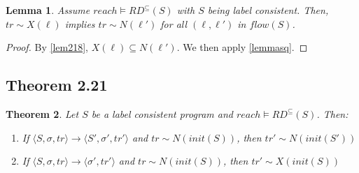 \documentclass[a4wide,12pt]{article}
\theoremstyle{definition}
\theoremstyle{plain}
\newtheorem{theo}{Theorem}
\newtheorem{lemma}[theo]{Lemma}
\theoremstyle{remark}
\def\const#1{\mathopen{\langle}#1\mathclose{\rangle}} %
\def\pair#1{\const{#1}}
\begin{document}
\begin{lemma}\label{lemmaflow}
Assume $reach \models RD^\subseteq(S)$ with $S$ being label consistent. Then,
$tr \sim X(\ell)$ implies $tr \sim N(\ell')$ for all $(\ell, \ell')$ in $flow(S)$.
\end{lemma}
\begin{proof}
By \ref{lem218}, $X(\ell) \subseteq N(\ell')$. We then apply \ref{lemmasq}.
\end{proof}

\subsection{Theorem 2.21}

\begin{theo}
\label{theo221}
Let $S$ be a label consistent program and $reach \models RD^{\subseteq}(S)$. Then:
\begin{enumerate}
\item If $\pair{S,\sigma, tr} \to \pair{S', \sigma', tr'}$ and $tr \sim N(init(S))$, then $tr' \sim N(init(S'))$
\item If $\pair{S,\sigma, tr} \to \pair{\sigma', tr'}$ and $tr \sim N(init(S))$, then $tr' \sim X(init(S))$
\end{enumerate}
\end{theo}
\end{document}

